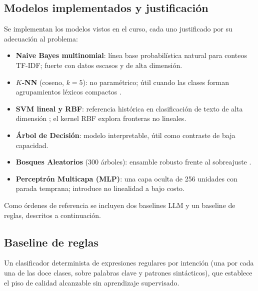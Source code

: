 \documentclass[journal]{IEEEtran}
\begin{document}
\subsection{Modelos implementados y justificaci\'on}
Se implementan los modelos vistos en el curso, cada uno justificado por su
adecuaci\'on al problema:
\begin{itemize}
  \item \textbf{Naive Bayes multinomial}: l\'inea base probabil\'istica natural
  para conteos TF-IDF; fuerte con datos escasos y de alta dimensi\'on.
  \item \textbf{$K$-NN} (coseno, $k=5$): no param\'etrico; \'util cuando las
  clases forman agrupamientos l\'exicos compactos \cite{cover1967nearest}.
  \item \textbf{SVM lineal y RBF}: referencia hist\'orica en clasificaci\'on de
  texto de alta dimensi\'on \cite{joachims1998svmtext,cortes1995svm}; el kernel
  RBF explora fronteras no lineales.
  \item \textbf{\'Arbol de Decisi\'on}: modelo interpretable, \'util como
  contraste de baja capacidad.
  \item \textbf{Bosques Aleatorios} (300 \'arboles): ensamble robusto frente al
  sobreajuste \cite{breiman2001randomforests}.
  \item \textbf{Perceptr\'on Multicapa (MLP)}: una capa oculta de 256 unidades
  con parada temprana; introduce no linealidad a bajo costo.
\end{itemize}
Como \'ordenes de referencia se incluyen dos baselines LLM y un baseline de
reglas, descritos a continuaci\'on.

\subsection{Baseline de reglas}
Un clasificador determinista de expresiones regulares por intenci\'on (una por
cada una de las doce clases, sobre palabras clave y patrones sint\'acticos),
que establece el piso de calidad alcanzable sin aprendizaje supervisado.
\end{document}
